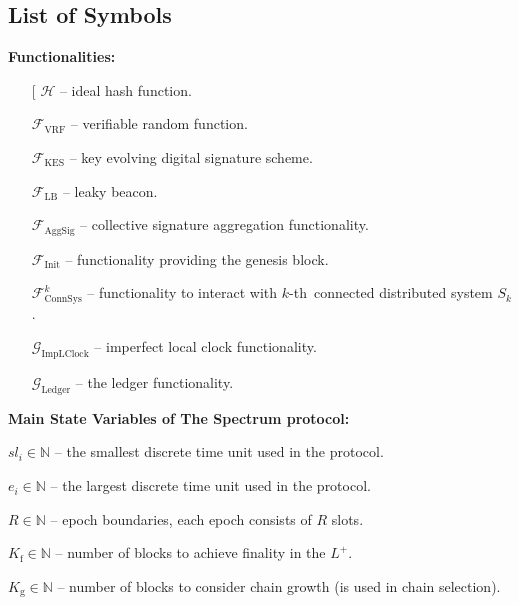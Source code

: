\subsection{List of Symbols}\label{subsec:list-of-symbols}

\textbf{Functionalities:}
\begin{itemize}
    \item[\fontencoding[\ding{113}] $\mathcal{H}$ -- ideal hash function.
    \item[\ding{113}] $\mathcal{F}_{\text{VRF}}$ -- verifiable random function.
    \item[\ding{113}] $\mathcal{F}_{\text{KES}}$ -- key evolving digital signature scheme.
    \item[\ding{113}] $\mathcal{F}_{\text{LB}}$ -- leaky beacon.
    \item[\ding{113}] $\mathcal{F}_{\text{AggSig}}$ -- collective signature aggregation functionality.
    \item[\ding{113}] $\mathcal{F}_{\text{Init}}$ -- functionality providing the genesis block.
    \item[\ding{113}] $\mathcal{F}^k_{\text{ConnSys}}$ -- functionality to interact with $k$-th\
    connected distributed system $S_k$.
    \item[\ding{113}] $\mathcal{G}_{\text{ImpLClock}}$ -- imperfect local clock functionality.
    \item[\ding{113}] $\mathcal{G}_{\text{Ledger}}$ -- the ledger functionality.
\end{itemize}
\bigbreak

\noindent
\textbf{Main State Variables of The Spectrum protocol:}
\begin{legal}
    \item[\ding{113}] $sl_i \in \mathbb{N}$ -- the smallest discrete time unit used in the protocol.
    \item[\ding{113}] $e_i \in \mathbb{N}$ -- the largest discrete time unit used in the protocol.
    \item[\ding{113}] $R \in \mathbb{N}$ -- epoch boundaries, each epoch consists of $R$ slots.
    \item[\ding{113}] $K_{\text{f}} \in \mathbb{N}$ -- number of blocks to achieve finality in the $L^+$.
    \item[\ding{113}] $K_{\text{g}} \in \mathbb{N}$ -- number of blocks to consider chain growth (is used in chain selection).

\end{legal}
\bigbreak

